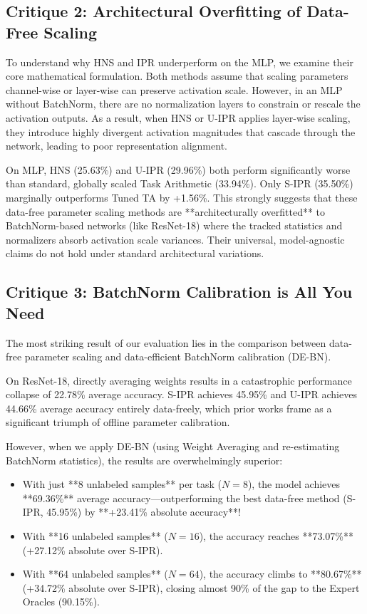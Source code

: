 \documentclass{article}
\begin{document}
\subsection{Critique 2: Architectural Overfitting of Data-Free Scaling}
To understand why HNS and IPR underperform on the MLP, we examine their core mathematical formulation. Both methods assume that scaling parameters channel-wise or layer-wise can preserve activation scale. However, in an MLP without BatchNorm, there are no normalization layers to constrain or rescale the activation outputs. As a result, when HNS or U-IPR applies layer-wise scaling, they introduce highly divergent activation magnitudes that cascade through the network, leading to poor representation alignment.

On MLP, HNS (25.63\%) and U-IPR (29.96\%) both perform significantly worse than standard, globally scaled Task Arithmetic (33.94\%). Only S-IPR (35.50\%) marginally outperforms Tuned TA by +1.56\%. This strongly suggests that these data-free parameter scaling methods are **architecturally overfitted** to BatchNorm-based networks (like ResNet-18) where the tracked statistics and normalizers absorb activation scale variances. Their universal, model-agnostic claims do not hold under standard architectural variations.

\subsection{Critique 3: BatchNorm Calibration is All You Need}
The most striking result of our evaluation lies in the comparison between data-free parameter scaling and data-efficient BatchNorm calibration (DE-BN). 

On ResNet-18, directly averaging weights results in a catastrophic performance collapse of 22.78\% average accuracy. S-IPR achieves 45.95\% and U-IPR achieves 44.66\% average accuracy entirely data-freely, which prior works frame as a significant triumph of offline parameter calibration.

However, when we apply DE-BN (using Weight Averaging and re-estimating BatchNorm statistics), the results are overwhelmingly superior:
\begin{itemize}
    \item With just **8 unlabeled samples** per task ($N=8$), the model achieves **69.36\%** average accuracy—outperforming the best data-free method (S-IPR, 45.95\%) by **+23.41\% absolute accuracy**!
    \item With **16 unlabeled samples** ($N=16$), the accuracy reaches **73.07\%** (+27.12\% absolute over S-IPR).
    \item With **64 unlabeled samples** ($N=64$), the accuracy climbs to **80.67\%** (+34.72\% absolute over S-IPR), closing almost 90\% of the gap to the Expert Oracles (90.15\%).
\end{itemize}
\end{document}
